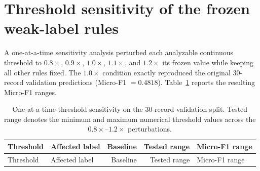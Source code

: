 \documentclass[10pt]{article}
\begin{document}
\section{Threshold sensitivity of the frozen weak-label rules}
A one-at-a-time sensitivity analysis perturbed each analyzable continuous threshold to $0.8\times$, $0.9\times$, $1.0\times$, $1.1\times$, and $1.2\times$ its frozen value while keeping all other rules fixed. The $1.0\times$ condition exactly reproduced the original 30-record validation predictions (Micro-F1 $=0.4818$). Table~\ref{tab:threshold_sensitivity} reports the resulting Micro-F1 ranges.

\begin{longtable}{p{}p{}rrp{}}
\caption{One-at-a-time threshold sensitivity on the 30-record validation split. Tested range denotes the minimum and maximum numerical threshold values across the $0.8\times$--$1.2\times$ perturbations.} \label{tab:threshold_sensitivity}\\
\toprule
Threshold & Affected label & Baseline & Tested range & Micro-F1 range \\
\midrule
\endfirsthead
\toprule
Threshold & Affected label & Baseline & Tested range & Micro-F1 range \\
\midrule
\endhead


\end{longtable}
\end{document}
